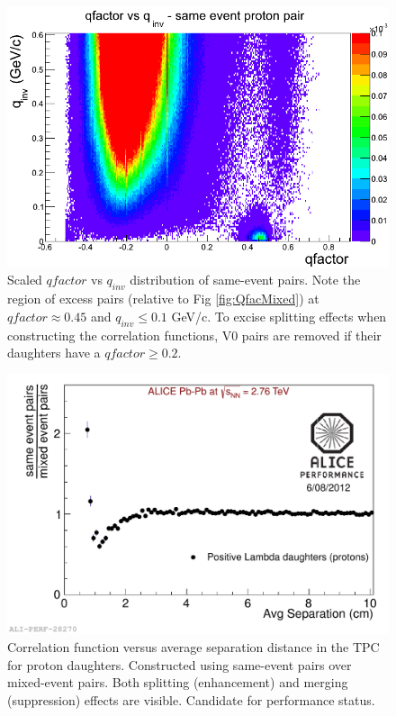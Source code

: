 {\begin{figure}[hbtp]
\includegraphics[scale=0.5]{Qfac_SameEvent.png}
\caption[$qfactor$ vs $q_{inv}$ distribution of same-event pairs]{Scaled $qfactor$ vs $q_{inv}$ distribution of same-event pairs.  Note the region of excess pairs (relative to Fig \ref{fig:QfacMixed}) at $qfactor \approx 0.45$ and $q_{inv} \leq 0.1$ GeV/c.  To excise splitting effects when constructing the correlation functions, V0 pairs are removed if their daughters have a $qfactor \geq 0.2$.}
\label{fig:QfacSame}
\end{figure}

\begin{figure}[hbtp]
\includegraphics[scale=0.6]{2012-Aug-07-TwoTrack_Perf.pdf}
\caption[Correlation function showing two-track reconstruction effects]{Correlation function versus average separation distance in the TPC for proton daughters.  Constructed using same-event pairs over mixed-event pairs.  Both splitting (enhancement) and merging (suppression) effects are visible.  Candidate for performance status.}
\label{fig:Merging}
\end{figure}

}
